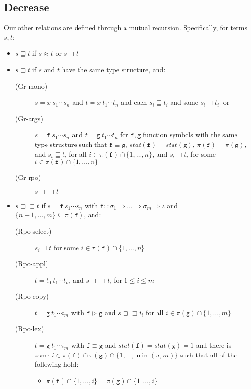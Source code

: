 \documentclass[a4paper,USenglish,cleveref,autoref,thm-restate]{lipics-v2021}
\newcommand{\arrtype}{\Rightarrow}
\newcommand{\grmain}{\sqsupset}
\newcommand{\geqmain}{\sqsupseteq}
\newcommand{\ismain}{\approx}
\newcommand{\rpomain}{\sqsupset\!\!\sqsupset}
\newcommand{\grpred}{\rhd}
\newcommand{\eqpred}{\equiv}
\newcommand{\symb}[1]{\mathtt{#1}}
\newcommand{\afun}{\symb{f}}
\newcommand{\bfun}{\symb{g}}
\newcommand{\atype}{\sigma}
\newcommand{\asort}{\iota}
\newcommand{\status}{\mathit{stat}}
\newcommand{\filter}{\pi}
\begin{document}
\subsection{Decrease}

Our other relations are defined through a mutual recursion.  Specifically, for terms $s,t$:

\begin{itemize}
\item $s \geqmain t$ if $s \ismain t$ or $s \grmain t$
\item $s \grmain t$ if $s$ and $t$ have the same type structure, and:
  \begin{description}
  \item[(Gr-mono)] $s = x\ s_1 \cdots s_n$ and $t = x\ t_1 \cdots t_n$ and each $s_i \geqmain t_i$
    and some $s_i \grmain t_i$, or
  \item[(Gr-args)] $s = \afun\ s_1 \cdots s_n$ and $t = \bfun\ t_1 \cdots t_n$ for $\afun,\bfun$
    function symbols with the same type structure such that $\afun \eqpred \bfun$,
    $\status(\afun) = \status(\bfun)$,
    $\filter(\afun) = \filter(\bfun)$, and 
    $s_i \geqmain t_i$ for all $i \in \filter(\afun) \cap \{1,\dots,n\}$, and
    $s_i \grmain t_i$ for some $i \in \filter(\afun) \cap \{1,\dots,n\}$
  \item[(Gr-rpo)] $s \rpomain t$
  \end{description}
\item $s \rpomain t$ if $s = \afun\ s_1 \cdots s_n$ with $\afun :: \atype_1 \arrtype \dots
  \arrtype \atype_m \arrtype \asort$ and $\{n+1,\dots,m\} \subseteq \filter(\afun)$, and:
  \begin{description}
  \item[(Rpo-select)] $s_i \geqmain t$ for some $i \in \filter(\afun) \cap \{1,\dots,n\}$
  \item[(Rpo-appl)] $t = t_0\ t_1 \cdots t_m$ and $s \rpomain t_i$ for $1 \leq i \leq m$
  \item[(Rpo-copy)] $t = \bfun\ t_1 \cdots t_m$ with $\afun \grpred \bfun$ and 
    $s \rpomain t_i$ for all $i \in \filter(\bfun) \cap \{1,\dots,m\}$
  \item[(Rpo-lex)] $t = \bfun\ t_1 \cdots t_m$ with $\afun \eqpred \bfun$ and
    $\status(\afun) = \status(\bfun) = 1$ and there is some $i \in \filter(\afun) \cap
    \filter(\bfun) \cap \{1,\dots,\min(n,m)\}$ such that all of the following hold:
    \begin{itemize}
    \item $\filter(\afun) \cap \{1,\dots,i\} = \filter(\bfun) \cap \{1,\dots,i\}$

\end{itemize}
\end{description}
\end{itemize}
\end{document}
